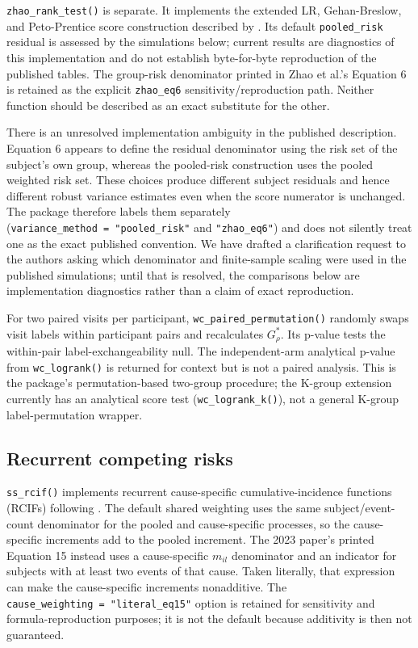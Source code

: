 \documentclass[
  12pt]{article}
\begin{document}
\texttt{zhao\_rank\_test()} is separate. It implements the extended LR,
Gehan-Breslow, and Peto-Prentice score construction described by
\citet{zhao2020}. Its default \texttt{pooled\_risk} residual is assessed
by the simulations below; current results are diagnostics of this
implementation and do not establish byte-for-byte reproduction of the
published tables. The group-risk denominator printed in Zhao et al.'s
Equation 6 is retained as the explicit \texttt{zhao\_eq6}
sensitivity/reproduction path. Neither function should be described as
an exact substitute for the other.

There is an unresolved implementation ambiguity in the published
description. Equation 6 appears to define the residual denominator using
the risk set of the subject's own group, whereas the pooled-risk
construction uses the pooled weighted risk set. These choices produce
different subject residuals and hence different robust variance
estimates even when the score numerator is unchanged. The package
therefore labels them separately
(\texttt{variance\_method\ =\ "pooled\_risk"} and \texttt{"zhao\_eq6"})
and does not silently treat one as the exact published convention. We
have drafted a clarification request to the authors asking which
denominator and finite-sample scaling were used in the published
simulations; until that is resolved, the comparisons below are
implementation diagnostics rather than a claim of exact reproduction.

For two paired visits per participant,
\texttt{wc\_paired\_permutation()} randomly swaps visit labels within
participant pairs and recalculates \(G_\rho^*\). Its p-value tests the
within-pair label-exchangeability null. The independent-arm analytical
p-value from \texttt{wc\_logrank()} is returned for context but is not a
paired analysis. This is the package's permutation-based two-group
procedure; the K-group extension currently has an analytical score test
(\texttt{wc\_logrank\_k()}), not a general K-group label-permutation
wrapper.

\subsection{Recurrent competing risks}\label{recurrent-competing-risks}

\texttt{ss\_rcif()} implements recurrent cause-specific
cumulative-incidence functions (RCIFs) following \citet{sivadasan2023}.
The default shared weighting uses the same subject/event-count
denominator for the pooled and cause-specific processes, so the
cause-specific increments add to the pooled increment. The 2023 paper's
printed Equation 15 instead uses a cause-specific \(m_{il}\) denominator
and an indicator for subjects with at least two events of that cause.
Taken literally, that expression can make the cause-specific increments
nonadditive. The \texttt{cause\_weighting\ =\ "literal\_eq15"} option is
retained for sensitivity and formula-reproduction purposes; it is not
the default because additivity is then not guaranteed.
\end{document}
